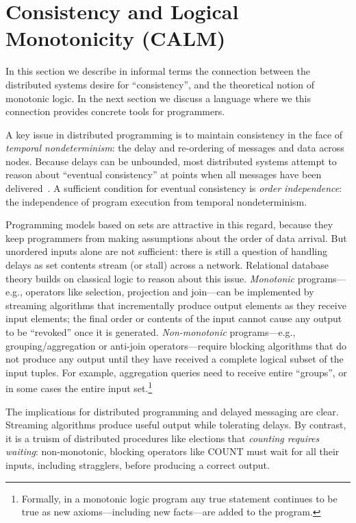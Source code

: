 \section{Consistency and Logical Monotonicity (CALM)}
In this section we describe in informal terms the connection between the distributed systems desire for ``consistency'', and the theoretical notion of monotonic logic.  In the next section we discuss a language where we this connection provides concrete tools for programmers.

A key issue in distributed programming is to maintain consistency in the face of {\em
temporal nondeterminism}: the delay and re-ordering of messages and data across
nodes.  Because delays can be unbounded, most distributed systems attempt to reason about ``eventual consistency'' at points when all messages have been delivered~\cite{vogels}.  A sufficient condition for eventual consistency is {\em order independence}: the independence of program execution from temporal
nondeterminism.

Programming models based on sets are attractive in this regard, because they keep programmers from making assumptions about the order of data arrival.  But unordered inputs alone are not sufficient: there is still a question of handling delays as set contents stream (or stall) across a network. Relational database theory builds on classical logic to reason about this issue. \emph{Monotonic} programs---e.g., operators like selection, projection and join---can be implemented by streaming algorithms that incrementally produce output elements as they receive input elements; the final order or contents of the input cannot cause any output to be ``revoked'' once it is generated.  
\emph{Non-monotonic} programs---e.g., grouping/aggregation or anti-join operators---require blocking algorithms that do not produce any output until they have received a complete logical subset of the input tuples.  For example, aggregation queries need to receive entire ``groups'', or in some cases the entire input set.\footnote{Formally, in a monotonic logic program any true statement continues to be true as new axioms---including new facts---are added to the program.}  

The implications for distributed programming and delayed messaging are clear. Streaming algorithms produce useful output while tolerating delays.  By contrast, it is a truism of distributed procedures like elections that \emph{counting requires waiting}: non-monotonic, blocking operators like COUNT must wait for all their inputs, including stragglers, before producing a correct output.

